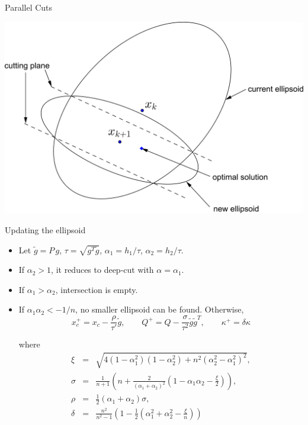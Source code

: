 \documentclass[10pt,ignorenonframetext,serif,onlymath]{beamer}
\begin{document}
\begin{frame}{Parallel Cuts}
\protect\hypertarget{sec:parallel-cuts-1}{}

\includegraphics{ellipsoid.files/parallel_cut.pdf}

\end{frame}

\begin{frame}{Updating the ellipsoid}
\protect\hypertarget{sec:updating-the-ellipsoid}{}

\begin{itemize}
\item
  Let \(\tilde{g} = P\,g\), \(\tau = \sqrt{g^T\tilde{g}}\),
  \(\alpha_1 = h_1/\tau\), \(\alpha_2 = h_2/\tau\).
\item
  If \(\alpha_2 > 1\), it reduces to deep-cut with
  \(\alpha = \alpha_1\).
\item
  If \(\alpha_1 > \alpha_2\), intersection is empty.
\item
  If \(\alpha_1 \alpha_2 < -1/n\), no smaller ellipsoid can be found.
  Otherwise, \[x_c^+ = x_c - \frac{\rho}{\tau'} \tilde{g}, \qquad
  Q^+ = Q - \frac{\sigma}{\tau^2} \tilde{g}\tilde{g}^T, \qquad
  \kappa^+ =  \delta \kappa
   \]

  where \[\begin{array}{lll}
    \xi &=& \sqrt{4(1 - \alpha_1^2)(1 - \alpha_2^2) + n^2(\alpha_2^2 - \alpha_1^2)^2}, \\
    \sigma &=& \frac{1}{n+1}(n + \frac{2}{(\alpha_1 + \alpha_2)^2}(1 - \alpha_1\alpha_2 - \frac{\xi}{2})), \\
    \rho &=& \frac{1}{2}(\alpha_1 + \alpha_2) \sigma, \\
    \delta &=& \frac{n^2}{n^2-1} (1 - \frac{1}{2}(\alpha_1^2 + \alpha_2^2 - \frac{\xi}{n}))
   \end{array}\]
\end{itemize}

\end{frame}
\end{document}
